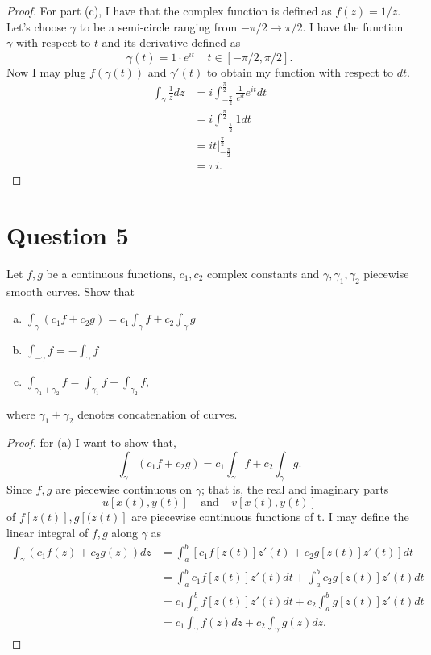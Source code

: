 \documentclass[10pt,two side,openright]{article}
\newcommand{\8}{\bar}
\newcommand{\f}{\frac}
\begin{document}
\begin{proof}
For part (c), I have that the complex function is defined as \newline $f(z) = 1/z.$ Let's choose $\gamma$ to be a semi-circle ranging from $-\pi/2 \to \pi/2.$ I have the function $\gamma$ with respect to $t$ and its derivative defined as 
\[\gamma(t) = 1\cdot e^{it} \ \ \ \ \ t \in [-\pi/2, \pi/2]. \]
Now I may plug $f(\gamma(t))$ and $\gamma'(t)$ to obtain my function with respect to $dt.$
\begin{align*}
\int_{\gamma} \f{1}{z} dz &= i \int_{-\f{\pi}{2}}^{\f{\pi}{2}} \f{1}{e^{it}}e^{it}dt   \\
				      &= i  \int_{-\f{\pi}{2}}^{\f{\pi}{2}}  1 dt \\
				      &= it \Big|_{-\f{\pi}{2}}^{\f{\pi}{2}} \\
				      &= \pi i. 
\end{align*}

\end{proof} 

\section{Question 5} 
Let $f,g$ be a continuous functions, $c_{1},c_{2}$ complex constants and $\gamma, \gamma_{1}, \gamma_{2}$ piecewise smooth curves. Show that 
\begin{enumerate}[(a)] 
\item $\int_{\gamma}(c_{1}f +c_{2}g) = c_{1}\int_{\gamma}f + c_{2}\int_{\gamma}g$
\item $\int_{-\gamma}f = -\int_{\gamma}f$ 
\item $\int_{\gamma_{1} +\gamma_{2}} f = \int_{\gamma_{1}} f + \int_{\gamma_{2}}f,$
\end{enumerate} 

where $\gamma_{1} + \gamma_{2}$ denotes concatenation of curves. 

\begin{proof} 
for (a) I want to show that, 
\[ \int_{\gamma}(c_{1}f +c_{2}g) = c_{1}\int_{\gamma}f + c_{2}\int_{\gamma}g.\] 
Since $f,g$ are piecewise continuous on $\gamma$; that is, the real and imaginary parts
\[u[x(t),y(t)] \ \ \ \ \ \text{and} \ \ \ \ \ v[x(t),y(t)] \]
of $f[z(t)],g[(z(t)]$ are piecewise continuous functions of t. I may define the linear integral of $f,g$ along $\gamma$ as
\begin{align*}
\int_{\gamma}(c_{1}f(z) +c_{2}g(z)) dz &= \int_{a}^{b}\left[c_{1}f[z(t)]z'(t) + c_{2}g[z(t)]z'(t)\right] dt \\
							  &= \int_{a}^{b} c_{1}f[z(t)]z'(t) dt + \int_{a}^{b} c_{2}g[z(t)]z'(t) dt \\	
							  &= c_{1}\int_{a}^{b} f[z(t)]z'(t) dt + c_{2}\int_{a}^{b} g[z(t)]z'(t) dt \\
							  &= c_{1}\int_{\gamma} f(z) dz + c_{2} \int_{\gamma} g(z) dz.
\end{align*} 
\end{proof} 
\end{document}
